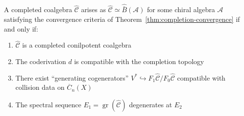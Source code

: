 \begin{theorem}\label{thm:koszul-dual-characterization}
A completed coalgebra $\widehat{\mathcal{C}}$ arises as $\widehat{\mathcal{C}} \simeq \widehat{\bar{B}}(\mathcal{A})$ for some chiral algebra $\mathcal{A}$ satisfying the convergence criteria of Theorem~\textup{\ref{thm:completion-convergence}} if and only if:
\begin{enumerate}
\item $\widehat{\mathcal{C}}$ is a completed conilpotent coalgebra
\item The coderivation $d$ is compatible with the completion topology
\item There exist ``generating cogenerators'' $V^* \hookrightarrow F_1\widehat{\mathcal{C}}/F_0\widehat{\mathcal{C}}$ compatible with collision data on $\overline{C}_n(X)$
\item The spectral sequence $E_1 = \operatorname{gr}(\widehat{\mathcal{C}})$ degenerates at $E_2$
\end{enumerate}
\end{theorem}

